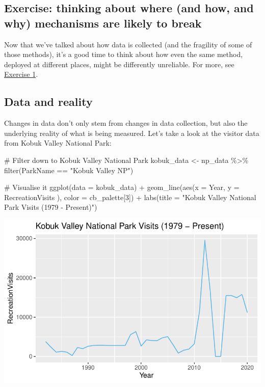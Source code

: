 \documentclass[
  letterpaper,
  DIV=11,
  numbers=noendperiod]{scrartcl}
\newenvironment{Shaded}{\begin{snugshade}}{\end{snugshade}}
\newcommand{\AttributeTok}[1]{\textcolor[rgb]{0.40,0.45,0.13}{#1}}
\newcommand{\CommentTok}[1]{\textcolor[rgb]{0.37,0.37,0.37}{#1}}
\newcommand{\DecValTok}[1]{\textcolor[rgb]{0.68,0.00,0.00}{#1}}
\newcommand{\FunctionTok}[1]{\textcolor[rgb]{0.28,0.35,0.67}{#1}}
\newcommand{\NormalTok}[1]{\textcolor[rgb]{0.00,0.23,0.31}{#1}}
\newcommand{\OtherTok}[1]{\textcolor[rgb]{0.00,0.23,0.31}{#1}}
\newcommand{\SpecialCharTok}[1]{\textcolor[rgb]{0.37,0.37,0.37}{#1}}
\newcommand{\StringTok}[1]{\textcolor[rgb]{0.13,0.47,0.30}{#1}}
\begin{document}
\subsection{Exercise: thinking about where (and how, and why) mechanisms
are likely to
break}\label{exercise-thinking-about-where-and-how-and-why-mechanisms-are-likely-to-break}

Now that we've talked about how data is collected (and the fragility of
some of those methods), it's a good time to think about how even the
same method, deployed at different places, might be differently
unreliable. For more, see \hyperref[exercise-1]{Exercise 1}.

\subsection{Data and reality}\label{data-and-reality}

Changes in data don't only stem from changes in data collection, but
also the underlying reality of what is being measured. Let's take a look
at the visitor data from Kobuk Valley National Park:

\begin{Shaded}
\begin{Highlighting}[]
\CommentTok{\# Filter down to Kobuk Valley National Park}
\NormalTok{kobuk\_data }\OtherTok{\textless{}{-}}\NormalTok{ np\_data }\SpecialCharTok{\%\textgreater{}\%} \FunctionTok{filter}\NormalTok{(ParkName }\SpecialCharTok{==} \StringTok{"Kobuk Valley NP"}\NormalTok{)}

\CommentTok{\# Visualise it}
\FunctionTok{ggplot}\NormalTok{(}\AttributeTok{data =}\NormalTok{ kobuk\_data) }\SpecialCharTok{+} 
  \FunctionTok{geom\_line}\NormalTok{(}\FunctionTok{aes}\NormalTok{(}\AttributeTok{x =}\NormalTok{ Year, }\AttributeTok{y =}\NormalTok{ RecreationVisits ), }\AttributeTok{color =}\NormalTok{ cb\_palette[}\DecValTok{3}\NormalTok{]) }\SpecialCharTok{+}
  \FunctionTok{labs}\NormalTok{(}\AttributeTok{title =} \StringTok{"Kobuk Valley National Park Visits (1979 {-} Present)"}\NormalTok{)}
\end{Highlighting}
\end{Shaded}

\includegraphics{index_files/figure-pdf/unnamed-chunk-5-1.pdf}
\end{document}
